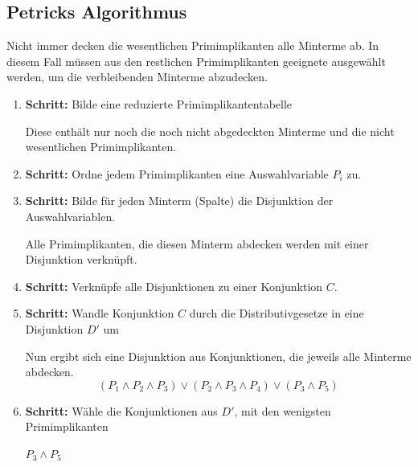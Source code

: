 \documentclass[12pt]{report}
\begin{document}
\subsection{Petricks Algorithmus}
Nicht immer decken die wesentlichen Primimplikanten alle Minterme ab. 
In diesem Fall müssen aus den restlichen Primimplikanten geeignete ausgewählt werden, 
um die verbleibenden Minterme abzudecken.


\begin{enumerate}
  \item \textbf{Schritt:} Bilde eine reduzierte Primimplikantentabelle
        
        Diese enthält nur noch die noch nicht abgedeckten Minterme und die nicht wesentlichen Primimplikanten.
        
  \item \textbf{Schritt:} Ordne jedem Primimplikanten eine Auswahlvariable $P_i$ zu.
        
  \item \textbf{Schritt:} Bilde für jeden Minterm (Spalte) die Disjunktion der Auswahlvariablen.
        
        Alle Primimplikanten, die diesen Minterm abdecken werden mit einer Disjunktion verknüpft.
        
  \item \textbf{Schritt:} Verknüpfe alle Disjunktionen zu einer Konjunktion $C$.
        
  \item \textbf{Schritt:} Wandle Konjunktion $C$ durch die Distributivgesetze in eine Disjunktion $D'$ um
        
        Nun ergibt sich eine Disjunktion aus Konjunktionen, die jeweils alle Minterme abdecken.
        $$(P_1 \wedge P_2 \wedge P_3) \vee (P_2 \wedge P_3 \wedge P_4) \vee (P_3 \wedge P_5)$$
        
  \item \textbf{Schritt:} Wähle die Konjunktionen aus $D'$, mit den wenigsten Primimplikanten
        
        $P_3 \wedge P_5$
        
\end{enumerate}
\end{document}
